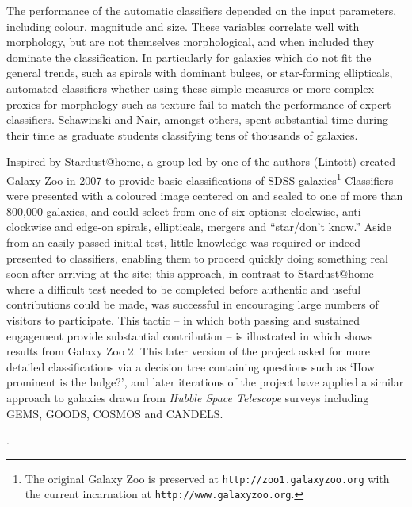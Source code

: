 \documentclass{ar2e}
\begin{document}

The performance of the automatic classifiers depended on the input parameters,
including colour, magnitude and size. These variables correlate well with
morphology, but are not themselves morphological, and when included they
dominate the classification. In particularly for galaxies which do not fit the
general trends, such as spirals with dominant bulges, or star-forming
ellipticals, automated classifiers whether using these simple measures or more
complex proxies for morphology such as texture fail to match the performance
of expert classifiers. Schawinski and Nair, amongst others, spent substantial
time during their time as graduate students classifying tens of thousands of
galaxies. 

Inspired by Stardust@home, a group led by one of the authors (Lintott) created
Galaxy Zoo in 2007 to provide basic classifications of SDSS
galaxies\footnote{The original Galaxy Zoo is preserved at
\texttt{http://zoo1.galaxyzoo.org} with the current incarnation at
\texttt{http://www.galaxyzoo.org}.} Classifiers were presented with a coloured
image centered on and scaled to one of more than 800,000 galaxies, and could
select from one of six options: clockwise, anti clockwise and edge-on spirals,
ellipticals, mergers and ``star/don't know.'' Aside from  an easily-passed
initial test, little knowledge was required or indeed presented to classifiers,
enabling them to proceed quickly doing something real soon after arriving at the
site; this approach, in contrast to Stardust@home where a difficult test needed
to be completed before authentic and useful contributions could be made, was
successful in encouraging large numbers of visitors to participate. This tactic
-- in which both passing and sustained engagement provide substantial
contribution -- is illustrated in \Fref{}  which shows results from Galaxy Zoo
2.  This later version of the project asked for more detailed
classifications via a decision tree containing questions such as `How prominent
is the bulge?', and later iterations of the project have applied a similar
approach to galaxies drawn from \emph{Hubble Space Telescope} surveys including
\textsc{GEMS, GOODS, COSMOS} and \textsc{CANDELS}. 

. 
\end{document}
